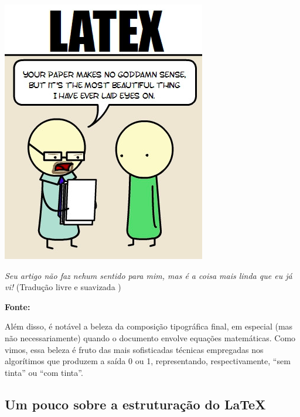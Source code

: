 \begin{marginfigure}
  \includegraphics[width = \linewidth]{piada-latex.png}
  
  {
    \sffamily
    \textit{Seu artigo não faz nehum sentido para 
    mim, mas é a coisa mais linda que eu já vi!}
    (Tradução livre e suavizada )
  }
  
  {\textsf{\textbf{Fonte:}} }
\end{marginfigure}

Além disso, é notável a beleza da composição tipográfica final, em especial (mas
não necessariamente) quando o documento envolve equações matemáticas.
Como vimos, essa \textsf{beleza} é fruto das mais sofisticadas técnicas empregadas 
nos algorítimos que produzem a saída \textsf{0} ou \textsf{1}, representando, 
respectivamente, ``sem tinta'' ou ``com tinta''.

\subsection{Um pouco sobre a estruturação do LaTeX} %

